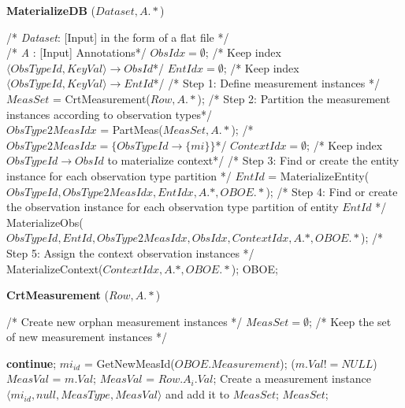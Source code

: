 \documentclass[10pt]{article}
\begin{document}
\begin{algorithm} [htb]
\caption{{\bf MaterializeDB} ($Dataset, A.*$)}
\label{alg:matdb}
{\small
\begin{algorithmic}
\STATE /* {\em Dataset}: [Input] in the form of a flat file */\\
\STATE /* {\em A }:  [Input] Annotations*/
\STATE
\STATE $ObsIdx =\emptyset$;  /* Keep index $\langle ObsTypeId, KeyVal\rangle \rightarrow ObsId$*/
\STATE $EntIdx = \emptyset$;  /* Keep index $\langle ObsTypeId, KeyVal\rangle \rightarrow EntId$*/
\STATE
{}
    \STATE /* Step 1: Define measurement instances */\\
            $MeasSet$ = CrtMeasurement($Row, A.*$);
    \STATE
    \STATE /* Step 2: Partition the measurement instances according to observation types*/\\
        $ObsType2MeasIdx$ = PartMeas($MeasSet, A.*$);  /*$ObsType2MeasIdx=\{ObsTypeId \rightarrow \{mi\}\}$*/
    \STATE
    \STATE $ContextIdx = \emptyset$;  /* Keep index $ObsTypeId \rightarrow ObsId$ to materialize context*/
      \STATE /* Step 3: Find or create the entity instance for each observation type partition */
        \STATE $EntId$ = MaterializeEntity($ObsTypeId, ObsType2MeasIdx, EntIdx, A.*, OBOE.*$);
        \STATE
        \STATE /* Step 4: Find or create the observation instance for each observation type partition of entity $EntId$ */
        \STATE MaterializeObs($ObsTypeId, EntId, ObsType2MeasIdx, ObsIdx, ContextIdx, A.*, OBOE.*$);
    \ENDFOR
    \STATE
    \STATE /* Step 5: Assign the context observation instances */  \\
            MaterializeContext($ContextIdx, A.*, OBOE.*$);
\ENDFOR
\RETURN OBOE;
\end{algorithmic}
}
\end{algorithm}

\begin{algorithm} [htb]
\caption{{\bf CrtMeasurement} ($Row, A.*$)}
{\small
\begin{algorithmic}
    \STATE/* Create new orphan measurement instances */
    \STATE $MeasSet = \emptyset$; /* Keep the set of new measurement instances */
		
		  {\bf continue};
		\STATE $mi_{id}$ = GetNewMeasId($OBOE.Measurement$);
		 ($m.Val!=NULL$) $MeasVal$ = $m.Val$;
		 $MeasVal$ = $Row.A_i.Val$;
		\STATE Create a measurement instance $\langle mi_{id}, null, MeasType, MeasVal\rangle$ and add it to $MeasSet$;
	\ENDFOR
    \RETURN $MeasSet$;
\end{algorithmic}
}
\end{algorithm}
\end{document}
